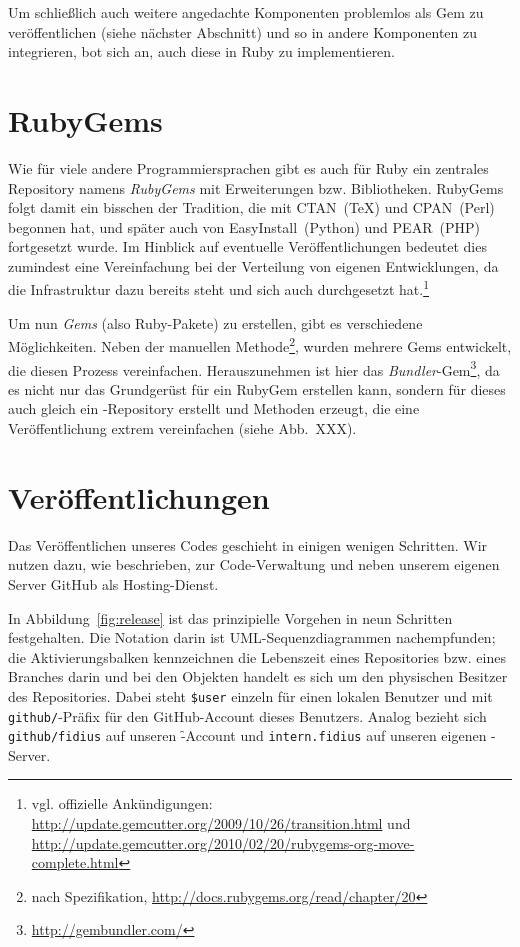 Um schließlich auch weitere angedachte Komponenten problemlos als Gem zu
veröffentlichen (siehe nächster Abschnitt) und so in andere Komponenten zu
integrieren, bot sich an, auch diese in Ruby zu implementieren.

\section{RubyGems}
\authors{\DM}{\MW \and \JF}

Wie für viele andere Programmiersprachen gibt es auch für Ruby ein zentrales
Repository namens \textit{RubyGems} mit Erweiterungen bzw.
Bibliotheken. RubyGems folgt damit ein bisschen der Tradition, die mit CTAN~(\TeX)
und CPAN~(Perl) begonnen hat, und später auch von EasyInstall~(Python) und
PEAR~(PHP) fortgesetzt wurde. Im Hinblick auf eventuelle Veröffentlichungen
bedeutet dies zumindest eine Vereinfachung bei der Verteilung von
eigenen Entwicklungen, da die Infrastruktur dazu bereits steht und sich
auch durchgesetzt hat.\footnote{vgl. offizielle Ankündigungen:
\url{http://update.gemcutter.org/2009/10/26/transition.html} und
\url{http://update.gemcutter.org/2010/02/20/rubygems-org-move-complete.html}}

Um nun \textit{Gems} (also Ruby-Pakete) zu erstellen, gibt es verschiedene
Möglichkeiten. Neben der manuellen Methode\footnote{nach Spezifikation,
\url{http://docs.rubygems.org/read/chapter/20}}, wurden mehrere Gems entwickelt,
die diesen Prozess vereinfachen. Herauszunehmen ist hier das
\textit{Bundler}-Gem\footnote{\url{http://gembundler.com/}}, da es nicht nur
das Grundgerüst für ein RubyGem erstellen kann, sondern für dieses auch gleich
ein -Repository erstellt und Methoden erzeugt, die eine Veröffentlichung
extrem vereinfachen (siehe Abb.~XXX).

\section{Veröffentlichungen}
\label{sec:publishing}

Das Veröffentlichen unseres Codes geschieht in einigen wenigen Schritten. Wir
nutzen dazu, wie beschrieben,  zur Code-Verwaltung und neben unserem eigenen
Server GitHub als Hosting-Dienst.

In Abbildung~\ref{fig:release} ist das prinzipielle Vorgehen in neun Schritten
festgehalten. Die Notation darin ist UML-Sequenzdiagrammen nachempfunden; die
Aktivierungsbalken kennzeichnen die Lebenszeit eines Repositories bzw. eines
Branches darin und bei den Objekten handelt es sich um den physischen Besitzer
des Repositories. Dabei steht \texttt{\$user} einzeln für einen lokalen Benutzer
und mit \texttt{github/}-Präfix für den GitHub-Account dieses Benutzers. Analog
bezieht sich \texttt{github/fidius} auf unseren \f-Account und
\texttt{intern.fidius} auf unseren eigenen -Server.

